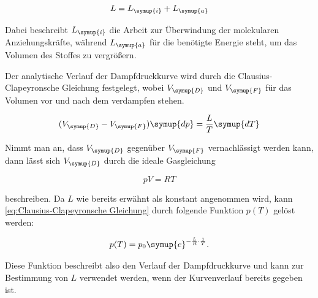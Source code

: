\begin{equation}
    L=L_{\symup{i}}+L_{\symup{a}}
    \label{eq:Verdampfungswärme}
\end{equation}

Dabei beschreibt $L_{\symup{i}}$ die Arbeit zur Überwindung der molekularen Anziehungskräfte, während $L_{\symup{a}}$
für die benötigte Energie steht, um das Volumen des Stoffes zu vergrößern.

Der analytische Verlauf der Dampfdruckkurve wird durch die Clausius-Clapeyronsche Gleichung festgelegt, wobei
$V_{\symup{D}}$ und $V_{\symup{F}}$ für das Volumen vor und nach dem verdampfen stehen.

\begin{equation}
    (V_{\symup{D}}-V_{\symup{F}})\symup{dp}=\frac{L}{T}\symup{dT}
    \label{eq:Clausius-Clapeyronsche Gleichung}
\end{equation}

Nimmt man an, dass $V_{\symup{D}}$ gegenüber $V_{\symup{F}}$ vernachlässigt werden kann, dann
lässt sich $V_{\symup{D}}$ durch die ideale Gasgleichung 

\begin{equation}
    pV=RT
    \label{eq:Ideale Gasgleichung}
\end{equation}

beschreiben. Da $L$ wie bereits erwähnt als konstant angenommen wird, kann \eqref{eq:Clausius-Clapeyronsche Gleichung}
durch folgende Funktion $p(T)$ gelöst werden:

\begin{equation}
    p(T)=p_0\symup{e}^{-\frac{L}{R}\cdot\frac{1}{T}}.
    \label{eq:Druck}
\end{equation}

Diese Funktion beschreibt also den Verlauf der Dampfdruckkurve und kann zur Bestimmung von $L$ verwendet werden, wenn
der Kurvenverlauf bereits gegeben ist.